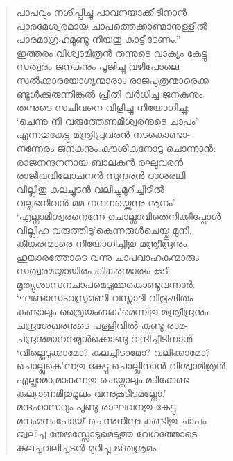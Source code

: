 \begin{verse}
പാപവും നശിപ്പിച്ചു പാവനയാക്കീടിനാന്‍\\
പാരമേശ്വരമായ ചാപത്തെക്കാണ്മാനുള്ളില്‍\\
പാരമാഗ്രഹമുണ്ടു നീയതു കാട്ടീടേണം.”\\
ഇത്തരം വിശ്വാമിത്രന്‍ തന്നുടെ വാക്യം കേട്ടു\\
സത്വരം ജനകനും പൂജിച്ചു വഴിപോലെ\\
സല്‍ക്കാരയോഗ്യന്മാരാം രാജപുത്രന്മാരെക്ക\\
ണ്ടുള്‍ക്കുരുന്നിങ്കല്‍ പ്രീതി വര്‍ധിച്ച ജനകനും\\
തന്നുടെ സചിവനെ വിളിച്ചു നിയോഗിച്ചു;\\
‘ചെന്നു നീ വരുത്തേണമീശ്വരനുടെ ചാപം’\\
എന്നതുകേട്ടു മന്ത്രിപ്രവരന്‍ നടകൊണ്ടാ-\\
നന്നേരം ജനകനും കൗശികനോടു ചൊന്നാന്‍:\\
രാജനന്ദനനായ ബാലകന്‍ രഘുവരന്‍\\
രാജീവവിലോചനന്‍ സുന്ദരന്‍ ദാശരഥി\\
വില്ലിതു കുലച്ചുടന്‍ വലിച്ചുമുറിച്ചീടില്‍\\
വല്ലഭനിവന്‍ മമ നന്ദനയ്ക്കെന്നു നൂനം’\\
‘എല്ലാമീശ്വരനെന്നേ ചൊല്ലാവിതെനിക്കിപ്പോള്‍\\
വില്ലിഹ വരുത്തീടു’കെന്നരുള്‍ചെയ്തു മുനി.\\
കിങ്കരന്മാരെ നിയോഗിച്ചിതു മന്ത്രീന്ദ്രനും\\
ഹുങ്കാരത്തോടെ വന്നു ചാപവാഹകന്മാരും\\
സത്വരമയ്യായിരം കിങ്കരന്മാരും കൂടി\\
മൃത്യുശാസനചാപമെടുത്തുകൊണ്ടുവന്നാര്‍.\\
‘ഘണ്ടാസഹസ്രമണി വസ്ത്രാദി വിഭൂഷിതം\\
കണ്ടാലും ത്രൈയംബക’മെന്നിതു മന്ത്രീന്ദ്രനും\\
ചന്ദ്രശേഖരനുടെ പള്ളിവില്‍ കണ്ടു രാമ-\\
ചന്ദ്രനുമാനന്ദമുള്‍ക്കൊണ്ടു വന്ദിച്ചീടിനാന്‍\\
‘വില്ലെടുക്കാമോ? കുലച്ചീടാമോ? വലിക്കാമോ?\\
ചൊല്ലുകെ’ന്നതു കേട്ടു ചൊല്ലിനാന്‍ വിശ്വാമിത്രന്‍.\\
എല്ലാമാ,മാകുന്നതു ചെയ്താലും മടിക്കേണ്ട\\
കല്യാണമിതുമൂലം വന്നുകൂടീടുമല്ലോ.’\\
മന്ദഹാസവും പൂണ്ടു രാഘവനതു കേട്ടു\\
മന്ദംമന്ദംപോയ് ചെന്നുനിന്നു കണ്ടിതു ചാപം\\
ജ്വലിച്ച തേജസ്സോടുമെടുത്തു വേഗത്തോടെ\\
കുലച്ചുവലിച്ചുടന്‍ മുറിച്ചു ജിതശ്രമം\\

\end{verse}

